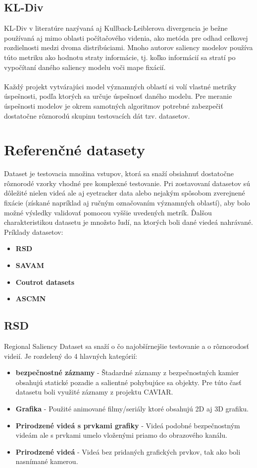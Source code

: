 \subsection{KL-Div}
KL-Div v literatúre nazývaná aj Kullback-Leiblerova divergencia\cite{kldiv} je bežne používaná aj mimo oblasti počítačového videnia, ako metóda pre odhad celkovej rozdielnosti medzi dvoma distribúciami.
Mnoho autorov saliency modelov používa túto metriku ako hodnotu straty informácie, tj. koľko informácií sa stratí po vypočítaní daného saliency modelu voči mape fixácií.
\\\\
Každý projekt vytvárajúci model významných oblastí si volí vlastné metriky úspešnosti, podľa ktorých sa určuje úspešnosť daného modelu.
Pre meranie úspešnosti modelov je okrem samotných algoritmov potrebné zabezpečiť dostatočne rôznorodú skupinu testovacích dát tzv. datasetov.

\section{Referenčné datasety}
Dataset je testovacia množina vstupov, ktorá sa snaží obsiahnuť dostatočne rôznorodé vzorky vhodné pre komplexné testovanie.
Pri zostavovaní datasetov sú dôležité nielen videá ale aj eyetracker data alebo nejakým spôsobom zverejnené fixácie (získané napríklad aj ručným označovaním významných oblastí), aby bolo možné výsledky validovať pomocou vyššie uvedených metrík.
Ďalšou charakteristikou datasetu je množsto ľudí, na ktorých boli dané viedeá nahrávané.
\\ Príklady datasetov:
\begin{itemize}
	\item \textbf{RSD}\cite{rsd}
	\item \textbf{SAVAM}\cite{savam}
	\item \textbf{Coutrot datasets}\cite{courot-database}
  \item \textbf{ASCMN}\cite{accv}
\end{itemize}

\subsection{RSD}
Regional Saliency Dataset sa snaží o čo najobšírnejšie testovanie a o rôznorodosť videií.
Je rozdelený do 4 hlavných kategórií:
\begin{itemize}
	\item \textbf{bezpečnostné záznamy} - Štadardné záznamy z bezpečnostných kamier obsahujú statické pozadie a salientné pohybujúce sa objekty.
Pre túto časť datasetu boli využité záznamy z projektu CAVIAR\cite{rsd-caviar}.
	\item \textbf{Grafika} - Použité animované filmy/seriály ktoré obsahujú 2D aj 3D grafiku.
  \item \textbf{Prirodzené videá s prvkami grafiky} - Videá podobné bezpečnostným videám ale s prvkami umelo vloženými priamo do obrazového kanálu.
  \item \textbf{Prirodzené videá} - Videá bez pridaných grafických prvkov, tak ako boli nasnímané kamerou.
\end{itemize}

